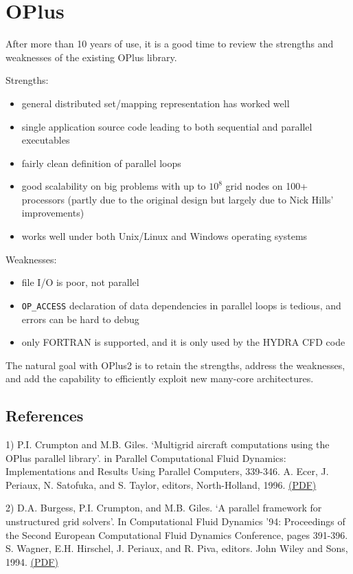 \documentclass[12pt]{article}
\begin{document}
\section{OPlus}

After more than 10 years of use, it is a good time to review the 
strengths and weaknesses of the existing OPlus library.

Strengths:
\begin{itemize}
\item
general distributed set/mapping representation has worked well
\item
single application source code leading to both sequential and 
parallel executables
\item
fairly clean definition of parallel loops
\item
good scalability on big problems with up to $10^8$ grid nodes
on 100+ processors (partly due to the original design 
but largely due to Nick Hills' improvements)
\item
works well under both Unix/Linux and Windows operating systems
\end{itemize}

Weaknesses:
\begin{itemize}
\item
file I/O is poor, not parallel
\item
{\tt OP\_ACCESS} declaration of data dependencies in parallel 
loops is tedious, and errors can be hard to debug
\item
only FORTRAN is supported, and it is only used by the HYDRA CFD code
\end{itemize}


The natural goal with OPlus2 is to retain the strengths, address the 
weaknesses, and add the capability to efficiently exploit new many-core 
architectures.

\subsection*{References}

1) P.I. Crumpton and M.B. Giles. `Multigrid aircraft computations using 
the OPlus parallel library'. in  Parallel Computational Fluid Dynamics: 
Implementations and Results Using Parallel Computers, 339-346. A. Ecer, 
J. Periaux, N. Satofuka, and S. Taylor, editors, North-Holland, 1996.  
\href{http://people.maths.ox.ac.uk/~gilesm/files/para_cfd95.pdf}{(PDF)}

2) D.A. Burgess, P.I. Crumpton, and M.B. Giles. `A parallel framework 
for unstructured grid solvers'. In Computational Fluid Dynamics '94: 
Proceedings of the Second European Computational Fluid Dynamics 
Conference, pages 391-396. S. Wagner, E.H. Hirschel, J. Periaux, and 
R. Piva, editors. John Wiley and Sons, 1994.  
\href{http://people.maths.ox.ac.uk/~gilesm/files/NA-95-20.pdf}{(PDF)}
\end{document}
